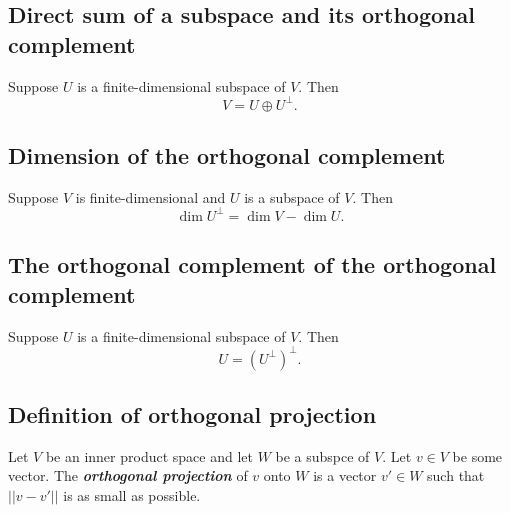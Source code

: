 \documentclass[11pt]{article}
\begin{document}
    \subsection{Direct sum of a subspace and its orthogonal complement}

    Suppose $U$ is a finite-dimensional subspace of $V$. Then \[V = U \oplus U^{\perp}.\]

    \subsection{Dimension of the orthogonal complement}

    Suppose $V$ is finite-dimensional and $U$ is a subspace of $V$. Then \[\dim U^{\perp} = \dim V - \dim U.\]

    \subsection{The orthogonal complement of the orthogonal complement}

    Suppose $U$ is a finite-dimensional subspace of $V$. Then \[U = (U^{\perp})^{\perp}.\]

    \subsection{Definition of orthogonal projection}

    Let $V$ be an inner product space and let $W$ be a subspce of $V$. Let \(v \in V\) be some vector. The \textbf{\emph{orthogonal projection}} of $v$ onto $W$ is a vector \(v' \in W\) such that \(||v - v'||\) is as small as possible.
\end{document}
